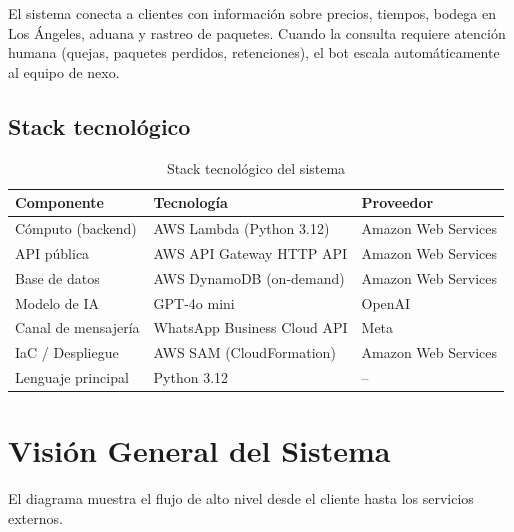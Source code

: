 \documentclass[12pt,a4paper]{article}
\begin{document}
\vspace{0.5em}
El sistema conecta a clientes con información sobre precios, tiempos, bodega en Los Ángeles,
aduana y rastreo de paquetes. Cuando la consulta requiere atención humana (quejas, paquetes
perdidos, retenciones), el bot escala automáticamente al equipo de nexo.

\subsection{Stack tecnológico}

\begin{table}[H]
\centering
\begin{tabular}{@{}lll@{}}
\toprule
\textbf{Componente} & \textbf{Tecnología} & \textbf{Proveedor} \\
\midrule
Cómputo (backend) & AWS Lambda (Python 3.12) & Amazon Web Services \\
API pública & AWS API Gateway HTTP API & Amazon Web Services \\
Base de datos & AWS DynamoDB (on-demand) & Amazon Web Services \\
Modelo de IA & GPT-4o mini & OpenAI \\
Canal de mensajería & WhatsApp Business Cloud API & Meta \\
IaC / Despliegue & AWS SAM (CloudFormation) & Amazon Web Services \\
Lenguaje principal & Python 3.12 & -- \\
\bottomrule
\end{tabular}
\caption{Stack tecnológico del sistema}
\end{table}

\section{Visión General del Sistema}

El diagrama muestra el flujo de alto nivel desde el cliente hasta los servicios externos.
\end{document}
